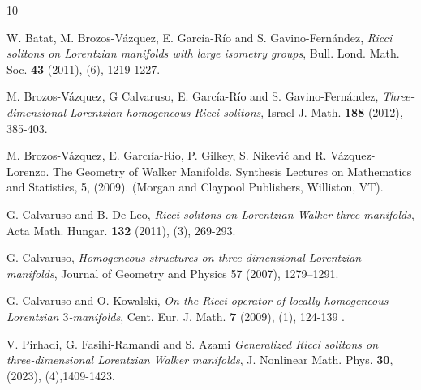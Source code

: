 \documentclass[reqno, 12pt]{amsart}
\numberwithin{equation}{section}
\begin{document}
\begin{thebibliography}{10}
W. Batat, M. Brozos-V\'azquez, E. Garc\'ia-R\'io and S. Gavino-Fern\'andez, 
\emph{Ricci solitons on Lorentzian manifolds with large isometry groups},
Bull. Lond. Math. Soc. {\bf 43} (2011), (6), 1219-1227.

M. Brozos-V\'azquez,  G Calvaruso, E. Garc\'ia-R\'io and  S. Gavino-Fern\'andez, 
\emph{Three-dimensional Lorentzian homogeneous Ricci solitons}, 
Israel J. Math. {\bf 188} (2012), 385-403.

M. Brozos-V\'azquez, E. Garcı\'ia-Rio, P. Gilkey, S. Nikevi\'c and 
R. V\'azquez-Lorenzo. The Geometry of Walker Manifolds. Synthesis Lectures on Mathematics and Statistics, 5, (2009). (Morgan and Claypool Publishers, Williston, VT).

G. Calvaruso and B. De Leo, 
\emph{Ricci solitons on Lorentzian Walker three-manifolds}, 
Acta Math. Hungar. {\bf 132} (2011), (3), 269-293.

G. Calvaruso, 
\emph{Homogeneous structures on three-dimensional Lorentzian manifolds}, Journal of Geometry and Physics 57 (2007), 1279–1291.

 G. Calvaruso and O. Kowalski, 
\emph{On the Ricci operator of locally homogeneous Lorentzian
$3$-manifolds},
 Cent. Eur. J. Math. {\bf 7} (2009), (1), 124-139 . 


V. Pirhadi, G. Fasihi‑Ramandi and S. Azami
\emph{Generalized Ricci solitons on three‑dimensional Lorentzian
Walker manifolds}, 
J. Nonlinear Math. Phys. {\bf 30},  (2023), (4),1409-1423. 



\end{thebibliography}
\end{document}
